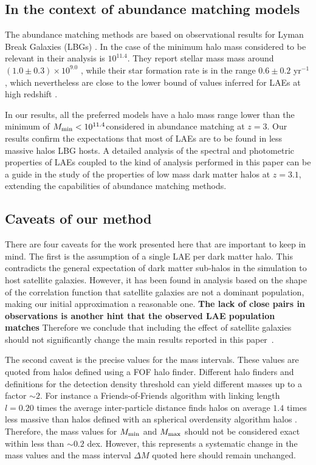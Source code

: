 \documentclass[usenatbib]{mn2e}
\newcommand{\documentname}{paper~}
\newcommand{\hMsun}{{\ifmmode{h^{-1}{\rm
        {M_{\odot}}}}\else{$h^{-1}{\rm{M_{\odot}}}$}\fi}}
\newcommand{\Msun}{{\ifmmode{{\rm {M_{\odot}}}}\else{${\rm{M_{\odot}}}$}\fi}}
\begin{document}
\subsection{In the context of abundance matching models}

The abundance matching methods are based on observational results for
Lyman Break Galaxies (LBGs) \citep{Behroozi2013a,Behroozi2013b}.  In
the case of \cite{Behroozi2013a} the minimum halo mass considered to
be relevant in their analysis is $10^{11.4}$\hMsun. They report
stellar mass mass around $(1.0\pm0.3)\times 10^{9.0}$ \hMsun, while
their star formation rate is in the range $0.6\pm 0.2$ \Msun yr$^{-1}$,
which nevertheless are close to the lower bound of values inferred for
LAEs at high redshift \citep{Gawiser2007,Nilsson2009,Pentericci2009}. 

In our results, all the preferred models have a halo mass range lower
than the minimum of $M_{\rm min}<10^{11.4}$\hMsun considered in
abundance matching at $z=3$. Our results confirm the expectations
that most of  LAEs are to be found in less massive halos LBG hosts. A
detailed analysis of the spectral and photometric properties of LAEs
coupled to the kind of analysis performed in this paper can be a guide
in the study of the properties of low mass dark matter halos at
$z=3.1$, extending the capabilities of abundance matching methods.

\subsection{Caveats of our method}

There are four caveats for the work presented here that are important
to keep in mind. The first is the  
assumption of a single LAE per dark matter halo. This contradicts the
general expectation of dark matter sub-halos in the simulation to host
satellite galaxies. However, it has been found in analysis based on
the shape of the correlation function \citep{Jose2013b} that satellite
galaxies are not a dominant population, making our initial
approximation a reasonable one. {\bf The lack of close pairs in
  observations is another hint that the observed LAE population matches}
Therefore we conclude that including the effect of satellite galaxies
should not significantly change the main results reported in this
\documentname.  

The second caveat is the precise values for the mass intervals. These
values are quoted from halos defined using a FOF halo
finder. Different halo finders and definitions for the detection
density threshold can yield different masses up to a factor $\sim 2$\citep{More2011}. For 
instance a Friends-of-Friends algorithm with linking length $l=0.20$
times the average inter-particle distance finds halos on average $1.4$
times less massive than halos defined  with an spherical overdensity
algorithm halos \citep{Bolshoi}. Therefore, the mass values for
$M_{\rm min}$ and $M_{\rm max}$ should not be considered exact within
less than $\sim 0.2$ dex. However, this represents a systematic change
in the mass values and the mass interval $\Delta M$ quoted here should
remain unchanged.
\end{document}
